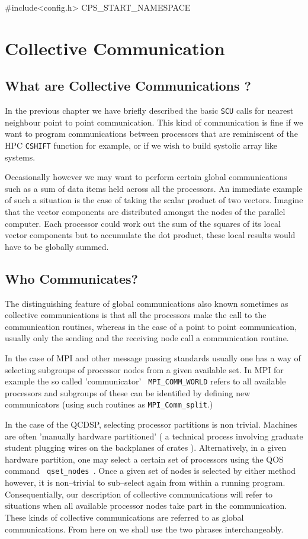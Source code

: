 #include<config.h>
CPS_START_NAMESPACE
\chapter{Collective Communication}
\section{What are Collective Communications ?}
In the previous chapter we have briefly described the basic {\tt SCU} 
calls for nearest neighbour point to point communication. This 
kind of communication is fine if we want to program communications
between processors that are reminiscent of the HPC {\tt CSHIFT} 
function for example, or if we wish to build systolic array like 
systems.

Occasionally however we may want to perform certain global communications
such as a sum of data items held across all the processors. An immediate
example of such a situation is the case of taking the scalar product of two vectors. Imagine that the vector
components are distributed amongst the nodes of the parallel computer. Each 
processor could work out the sum of the squares of its local vector components
but to accumulate the dot product, these local results would have to be
globally summed. 

\section{Who Communicates?}
The distinguishing feature of global communications also known
sometimes as collective communications is that all the processors make
the call to the communication routines, whereas in the case of a point
to point communication, usually only the sending and the receiving
node call a communication routine.

In the case of MPI and other message passing standards usually one has
a way of selecting subgroups of processor nodes from a given available
set. In MPI for example the so called 'communicator' {\tt
MPI\_COMM\_WORLD} refers to all available processors and subgroups of
these can be identified by defining new communicators (using such
routines as {\tt MPI\_Comm\_split}.)

In the case of the QCDSP, selecting processor partitions is non
trivial. Machines are often 'manually hardware partitioned' ( a
technical process involving graduate student plugging wires on the
backplanes of crates ).  Alternatively, in a given hardware partition,
one may select a certain set of processors using the QOS command {\tt
qset\_nodes }.  Once a given set of nodes is selected by either method
however, it is non--trivial to sub--select again from within a running
program.  Consequentially, our description of collective
communications will refer to situations when all available processor
nodes take part in the communication. These kinds of collective
communications are referred to as global communications. From here on
we shall use the two phrases interchangeably.


